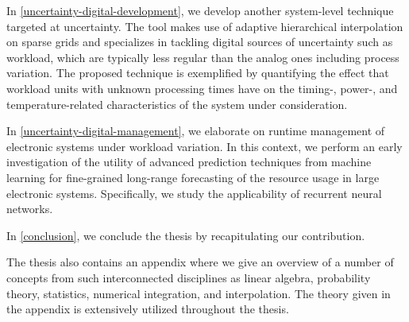 In \cref{uncertainty-digital-development}, we develop another system-level
technique targeted at uncertainty. The tool makes use of adaptive hierarchical
interpolation on sparse grids and specializes in tackling digital sources of
uncertainty such as workload, which are typically less regular than the analog
ones including process variation. The proposed technique is exemplified by
quantifying the effect that workload units with unknown processing times have on
the timing-, power-, and temperature-related characteristics of the system under
consideration.

In \cref{uncertainty-digital-management}, we elaborate on runtime management of
electronic systems under workload variation. In this context, we perform an
early investigation of the utility of advanced prediction techniques from
machine learning for fine-grained long-range forecasting of the resource usage
in large electronic systems. Specifically, we study the applicability of
recurrent neural networks.

In \cref{conclusion}, we conclude the thesis by recapitulating our contribution.

The thesis also contains an appendix where we give an overview of a number of
concepts from such interconnected disciplines as linear algebra, probability
theory, statistics, numerical integration, and interpolation. The theory given
in the appendix is extensively utilized throughout the thesis.
